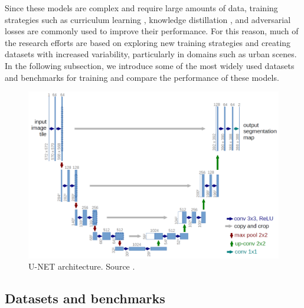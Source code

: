 Since these models are complex and require large amounts of data, training strategies such as curriculum learning \cite{Zhang2017}, knowledge distillation \cite{Tung2019SimilarityPreservingKD}, and adversarial losses \cite{Tsai_adaptseg_2018} are commonly used to improve their performance. For this reason, much of the research efforts are based on exploring new training strategies and creating datasets with increased variability, particularly in domains such as urban scenes. In the following subsection, we introduce some of the most widely used datasets and benchmarks for training and compare the performance of these models.

\begin{figure}
    \centering
    \includegraphics[width=0.75\columnwidth]{img/2-related-work/u-net-architecture.png}
    \caption[U-NET architecture]{U-NET architecture. Source \cite{UNET}.}
    \label{fig:unet}
\end{figure}

\subsection{Datasets and benchmarks}

